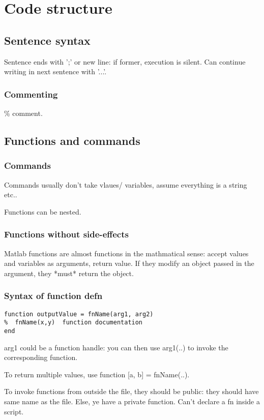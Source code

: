\section{Code structure}
\subsection{Sentence syntax}
Sentence ends with ';' or new line: if former, execution is silent. Can continue writing in next sentence with '...'.

\subsubsection{Commenting}
\% comment.

\subsection{Functions and commands}
\subsubsection{Commands}
Commands usually don't take vlaues/ variables, assume everything is a string etc..

Functions can be nested.

\subsubsection{Functions without side-effects}
Matlab functions are almost functions in the mathmatical sense: accept values and variables as arguments, return value. If they modify an object passed in the argument, they *must* return the object.

\subsubsection{Syntax of function defn}
\begin{verbatim}
function outputValue = fnName(arg1, arg2)
%  fnName(x,y)  function documentation
end

\end{verbatim}

arg1 could be a function handle: you can then use arg1(..) to invoke the corresponding function.

To return multiple values, use function [a, b] = fnName(..).

To invoke functions from outside the file, they should be public: they should have same name as the file. Else, ye have a private function. Can't declare a fn inside a script.

